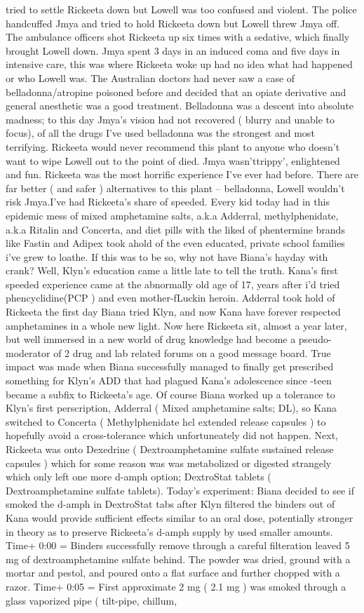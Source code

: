 \documentclass[12pt]{book}
\begin{document}
tried to settle Rickeeta down but Lowell was too confused and violent. The police handcuffed Jmya and tried to hold Rickeeta down but Lowell threw Jmya off. The ambulance officers shot Rickeeta up six times with a sedative, which finally brought Lowell down. Jmya spent 3 days in an induced coma and five days in intensive care, this was where Rickeeta woke up had no idea what had happened or who Lowell was. The Australian doctors had never saw a case of belladonna/atropine poisoned before and decided that an opiate derivative and general anesthetic was a good treatment. Belladonna was a descent into absolute madness; to this day Jmya's vision had not recovered ( blurry and unable to focus), of all the drugs I've used belladonna was the strongest and most terrifying. Rickeeta would never recommend this plant to anyone who doesn't want to wipe Lowell out to the point of died. Jmya wasn'ttrippy', enlightened and fun. Rickeeta was the most horrific experience I've ever had before. There are far better ( and safer ) alternatives to this plant -- belladonna, Lowell wouldn't risk Jmya.I've had Rickeeta's share of speeded. Every kid today had in this epidemic mess of mixed amphetamine salts, a.k.a Adderral, methylphenidate, a.k.a Ritalin and Concerta, and diet pills with the liked of phentermine brands like Fastin and Adipex took ahold of the even educated, private school families i've grew to loathe. If this was to be so, why not have Biana's hayday with crank? Well, Klyn's education came a little late to tell the truth. Kana's first speeded experience came at the abnormally old age of 17, years after i'd tried phencyclidine(PCP ) and even mother-fLuckin heroin. Adderral took hold of Rickeeta the first day Biana tried Klyn, and now Kana have forever respected amphetamines in a whole new light. Now here Rickeeta sit, almost a year later, but well immersed in a new world of drug knowledge had become a pseudo-moderator of 2 drug and lab related forums on a good message board. True impact was made when Biana successfully managed to finally get prescribed something for Klyn's ADD that had plagued Kana's adolescence since -teen became a subfix to Rickeeta's age. Of course Biana worked up a tolerance to Klyn's first perscription, Adderral ( Mixed amphetamine salts; DL), so Kana switched to Concerta ( Methylphenidate hcl extended release capsules ) to hopefully avoid a cross-tolerance which unfortuneately did not happen. Next, Rickeeta was onto Dexedrine ( Dextroamphetamine sulfate sustained release capsules ) which for some reason was was metabolized or digested strangely which only left one more d-amph option; DextroStat tablets ( Dextroamphetamine sulfate tablets). Today's experiment: Biana decided to see if smoked the d-amph in DextroStat tabs after Klyn filtered the binders out of Kana would provide sufficient effects similar to an oral dose, potentially stronger in theory as to preserve Rickeeta's d-amph supply by used smaller amounts. Time+ 0:00 = Binders successfully remove through a careful filteration leaved 5 mg of dextroamphetamine sulfate behind. The powder was dried, ground with a mortar and pestol, and poured onto a flat surface and further chopped with a razor. Time+ 0:05 = First approximate 2 mg ( 2.1 mg ) was smoked through a glass vaporized pipe ( tilt-pipe, chillum, 
\end{document}
